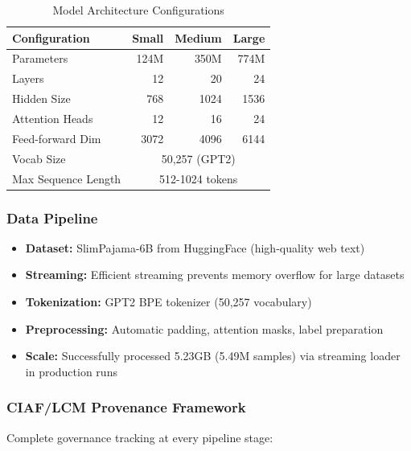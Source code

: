 \documentclass[11pt,a4paper]{article}
\begin{document}
\begin{table}[H]
\centering
\begin{tabular}{lrrr}
\toprule
\textbf{Configuration} & \textbf{Small} & \textbf{Medium} & \textbf{Large} \\
\midrule
Parameters & 124M & 350M & 774M \\
Layers & 12 & 20 & 24 \\
Hidden Size & 768 & 1024 & 1536 \\
Attention Heads & 12 & 16 & 24 \\
Feed-forward Dim & 3072 & 4096 & 6144 \\
Vocab Size & \multicolumn{3}{c}{50,257 (GPT2)} \\
Max Sequence Length & \multicolumn{3}{c}{512-1024 tokens} \\
\bottomrule
\end{tabular}
\caption{Model Architecture Configurations}
\label{tab:model-configs}
\end{table}

\subsubsection{Data Pipeline}
\begin{itemize}
    \item \textbf{Dataset:} SlimPajama-6B from HuggingFace (high-quality web text)
    \item \textbf{Streaming:} Efficient streaming prevents memory overflow for large datasets
    \item \textbf{Tokenization:} GPT2 BPE tokenizer (50,257 vocabulary)
    \item \textbf{Preprocessing:} Automatic padding, attention masks, label preparation
    \item \textbf{Scale:} Successfully processed 5.23GB (5.49M samples) via streaming loader in production runs
\end{itemize}

\subsubsection{CIAF/LCM Provenance Framework}
Complete governance tracking at every pipeline stage:
\end{document}
